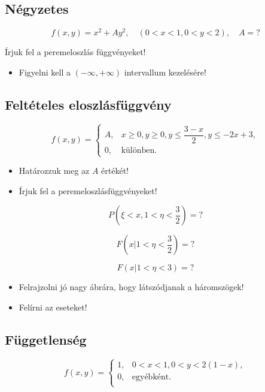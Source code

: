 \documentclass[a4paper]{article}
\newenvironment{solution}
{\color{RoyalBlue}}{\bigskip}
\begin{document}
\subsection{Négyzetes}

\[
f(x, y) = x^2 + A y^2, \quad (0 < x < 1, 0 < y < 2), \quad A = ?
\]

Írjuk fel a peremeloszlás függvényeket!

\begin{solution}
\begin{itemize}
\item Figyelni kell a $(-\infty, +\infty)$ intervallum kezelésére!
\end{itemize}
\end{solution}

\subsection{Feltételes eloszlásfüggvény}

\[
f(x, y) = \begin{cases}
A, & x \geq 0, y \geq 0, y \leq \dfrac{3 - x}{2}, y \leq -2x + 3, \\
0, & \text{különben}.
\end{cases}
\]

\begin{itemize}
\item Határozzuk meg az $A$ értékét!
\item Írjuk fel a peremeloszlásfüggvényeket!
\end{itemize}

\[
P\left(\xi < x, 1 < \eta < \dfrac{3}{2}\right) = ?
\]

\[
F\left(x|1 < \eta < \dfrac{3}{2}\right) = ?
\]

\[
F(x|1 < \eta < 3) = ?
\]

\begin{solution}
\begin{itemize}
\item Felrajzolni jó nagy ábrára, hogy látszódjanak a háromszögek!
\item Felírni az eseteket!
\end{itemize}
\end{solution}

\subsection{Függetlenség}

\[
f(x, y) = \begin{cases}
1, & 0 < x < 1, 0 < y < 2(1 - x), \\
0, & \text{egyébként}. \\
\end{cases}
\]
\end{document}
